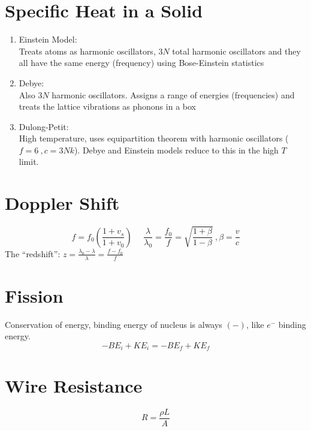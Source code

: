 \documentclass[10pt,letter]{article}
\begin{document}
\section{Specific Heat in a Solid} %
\label{sec:specific_heat_in_a_solid}
\begin{enumerate}
    \item Einstein Model:\\
    Treats atoms as harmonic oscillators, $3N$ total harmonic oscillators and they all have the same energy (frequency) using Bose-Einstein statistics
    \item Debye:\\
    Also $3N$ harmonic oscillators. Assigns a range of energies (frequencies) and treats the lattice vibrations as phonons in a box
    \item Dulong-Petit:\\
    High temperature, uses equipartition theorem with harmonic oscillators ($f=6~,c=3Nk$). Debye and Einstein models reduce to this in the high $T$ limit.
\end{enumerate}

\section{Doppler Shift} %
\label{sec:doppler_shift}
\begin{equation}
    f = f_0 \left( \frac{1 + v_s}{1 + v_0} \right) ~~~~~~ \frac{\lambda}{\lambda_0} = \frac{f_0}{f} = \sqrt{\frac{1 + \beta}{1 -\beta}}~, \beta = \frac{v}{c}
\end{equation}
The ``redshift'': $z = \frac{\lambda_0 - \lambda}{\lambda} = \frac{f -f_0}{f}$

\section{Fission} %
\label{sec:fission}
Conservation of energy, binding energy of nucleus is always $(-)$, like $e^-$ binding energy.
\begin{equation}
    -BE_i + KE_i = -BE_f + KE_f
\end{equation}

\section{Wire Resistance} %
\label{sec:wire_resistance}
\begin{equation}
    R = \frac{\rho L}{A}
\end{equation}
\end{document}
